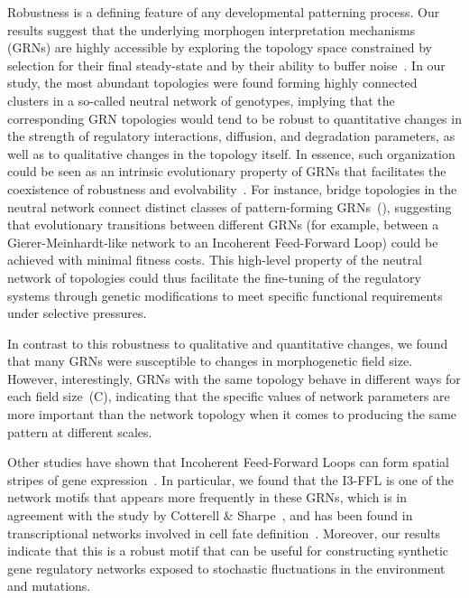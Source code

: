 \documentclass[10pt,letterpaper]{article}
\begin{document}
Robustness is a defining feature of any developmental patterning process.
Our results suggest that the underlying morphogen interpretation
mechanisms (GRNs) are highly accessible by exploring the
topology space constrained by selection for their final steady-state and
by their ability to buffer noise~\cite{lo_robust_2015, exelby_2021}.
In our study, the most abundant topologies were found forming highly
connected clusters in a so-called neutral network of genotypes,
implying that the corresponding GRN topologies would tend to be robust
to quantitative changes in the strength of regulatory interactions, diffusion, and
degradation parameters, as well as to qualitative changes in the topology
itself. In essence, such organization could be seen as an intrinsic evolutionary
property of GRNs that facilitates the coexistence of robustness and
evolvability~\cite{wagner_robustness_2008}. For instance, bridge topologies
in the neutral network connect distinct classes of pattern-forming
GRNs~(), suggesting that evolutionary transitions between
different GRNs (for example, between a Gierer-Meinhardt-like network to an
Incoherent Feed-Forward Loop) could be achieved with minimal fitness
costs. This high-level property of the neutral network of topologies could thus
facilitate the fine-tuning of the regulatory systems through genetic modifications
to meet specific functional requirements under selective pressures.

In contrast to this robustness to
qualitative and quantitative changes, we found that many GRNs were susceptible
to changes in morphogenetic field size. However, interestingly, GRNs with the same
topology behave in different ways for each field size~(C),
indicating that the specific values of network parameters are more important
than the network topology when it comes to producing the same pattern at
different scales.

Other studies have shown that Incoherent Feed-Forward Loops can form
spatial stripes of gene expression~\cite{ishihara_cross_2005}. In particular,
we found that the I3-FFL is one of the network motifs that appears more
frequently in these GRNs, which is in agreement with the study by Cotterell \&
Sharpe~\cite{Cotterell2010}, and has been found in transcriptional networks involved
in cell fate definition~\cite{Li2019}. Moreover, our results indicate that this
is a robust motif that can be useful for constructing synthetic gene
regulatory networks exposed to stochastic fluctuations in the
environment and mutations.
\end{document}
